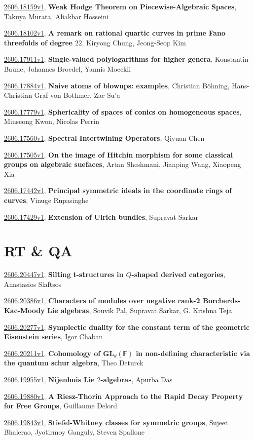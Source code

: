 \documentclass[9pt, a4paper]{article}
\theoremstyle{plain}
\theoremstyle{definition}
\theoremstyle{remark}
\newcommand{\arxiv}[3]{\href{https://arxiv.org/abs/#1}{#1}, \textbf{\textcolor{arxivblue}{#2}}, #3}
\begin{document}
\arxiv{2606.18159v1}{Weak Hodge Theorem on Piecewise-Algebraic Spaces}{Takuya Murata, Aliakbar Hosseini}

\arxiv{2606.18102v1}{A remark on rational quartic curves in prime Fano threefolds of degree $22$}{Kiryong Chung, Jeong-Seop Kim}

\arxiv{2606.17911v1}{Single-valued polylogarithms for higher genera}{Konstantin Baune, Johannes Broedel, Yannis Moeckli}

\arxiv{2606.17884v1}{Naive atoms of blowups: examples}{Christian Böhning, Hans-Christian Graf von Bothmer, Zac Su'a}

\arxiv{2606.17779v1}{Sphericality of spaces of conics on homogeneous spaces}{Minseong Kwon, Nicolas Perrin}

\arxiv{2606.17560v1}{Spectral Intertwining Operators}{Qiyuan Chen}

\arxiv{2606.17505v1}{On the image of Hitchin morphism for some classical groups on algebraic suefaces}{Artan Sheshmani, Jianping Wang, Xiaopeng Xia}

\arxiv{2606.17442v1}{Principal symmetric ideals in the coordinate rings of curves}{Vinuge Rupasinghe}

\arxiv{2606.17429v1}{Extension of Ulrich bundles}{Supravat Sarkar}


\section{RT \& QA}
\arxiv{2606.20447v1}{Silting t-structures in $Q$-shaped derived categories}{Anastasios Slaftsos}

\arxiv{2606.20386v1}{Characters of modules over negative rank-2 Borcherds-Kac-Moody Lie algebras}{Souvik Pal, Supravat Sarkar, G. Krishna Teja}

\arxiv{2606.20277v1}{Symplectic duality for the constant term of the geometric Eisenstein series}{Igor Chaban}

\arxiv{2606.20211v1}{Cohomology of $\mathbf{GL}_d(\mathbb{F})$ in non-defining characteristic via the quantum schur algebra}{Theo Deturck}

\arxiv{2606.19955v1}{Nijenhuis Lie $2$-algebras}{Apurba Das}

\arxiv{2606.19880v1}{A Riesz-Thorin Approach to the Rapid Decay Property for Free Groups}{Guillaume Delord}

\arxiv{2606.19843v1}{Stiefel-Whitney classes for symmetric groups}{Sujeet Bhalerao, Jyotirmoy Ganguly, Steven Spallone}
\end{document}

